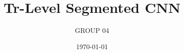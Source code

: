 \documentclass[12pt]{article}
\title{Tr-Level Segmented CNN }
\author{ GROUP 04 }
\date{\today}
\begin{document}






















\newpage
{
  \setlength{\parskip}{0em}
  \renewcommand\contentsname{TABLE OF CONTENTS} %
  \tableofcontents %
}




\newpage










 


\end{document}
